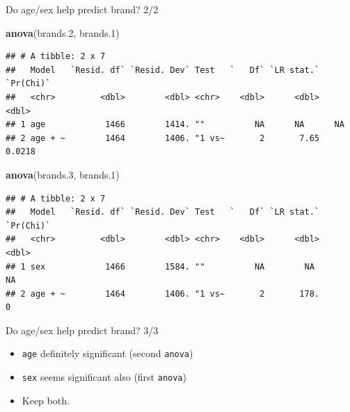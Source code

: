 \documentclass[
  ignorenonframetext,
]{beamer}
\newenvironment{Shaded}{\begin{snugshade}}{\end{snugshade}}
\newcommand{\FloatTok}[1]{\textcolor[rgb]{0.00,0.00,0.81}{#1}}
\newcommand{\KeywordTok}[1]{\textcolor[rgb]{0.13,0.29,0.53}{\textbf{#1}}}
\newcommand{\NormalTok}[1]{#1}
\begin{document}
\begin{frame}[fragile]{Do age/sex help predict brand? 2/2}
\protect\hypertarget{do-agesex-help-predict-brand-22}{}

\scriptsize

\begin{Shaded}
\begin{Highlighting}[]
\KeywordTok{anova}\NormalTok{(brands}\FloatTok{.2}\NormalTok{, brands}\FloatTok{.1}\NormalTok{)}
\end{Highlighting}
\end{Shaded}

\begin{verbatim}
## # A tibble: 2 x 7
##   Model   `Resid. df` `Resid. Dev` Test   `   Df` `LR stat.` `Pr(Chi)`
##   <chr>         <dbl>        <dbl> <chr>    <dbl>      <dbl>     <dbl>
## 1 age            1466        1414. ""          NA      NA      NA     
## 2 age + ~        1464        1406. "1 vs~       2       7.65    0.0218
\end{verbatim}

\begin{Shaded}
\begin{Highlighting}[]
\KeywordTok{anova}\NormalTok{(brands}\FloatTok{.3}\NormalTok{, brands}\FloatTok{.1}\NormalTok{)}
\end{Highlighting}
\end{Shaded}

\begin{verbatim}
## # A tibble: 2 x 7
##   Model   `Resid. df` `Resid. Dev` Test   `   Df` `LR stat.` `Pr(Chi)`
##   <chr>         <dbl>        <dbl> <chr>    <dbl>      <dbl>     <dbl>
## 1 sex            1466        1584. ""          NA        NA         NA
## 2 age + ~        1464        1406. "1 vs~       2       178.         0
\end{verbatim}

\normalsize

\end{frame}

\begin{frame}[fragile]{Do age/sex help predict brand? 3/3}
\protect\hypertarget{do-agesex-help-predict-brand-33}{}

\begin{itemize}
\item
  \texttt{age} definitely significant (second \texttt{anova})
\item
  \texttt{sex} seems significant also (first \texttt{anova})
\item
  Keep both.
\end{itemize}

\end{frame}
\end{document}
